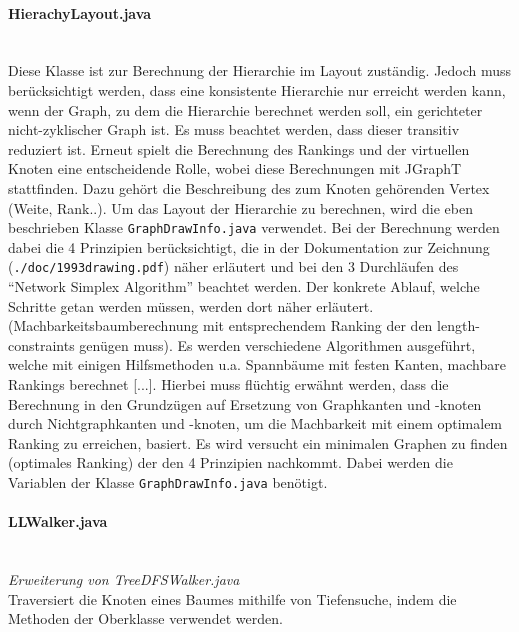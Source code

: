 \documentclass[10pt,a4paper]{article}
\begin{document}
\paragraph{HierachyLayout.java}\ \\
{\footnotesize Diese Klasse ist zur Berechnung der Hierarchie im Layout zuständig. Jedoch muss berücksichtigt werden, dass eine konsistente Hierarchie nur erreicht werden kann, wenn der Graph, zu dem die Hierarchie berechnet werden soll, ein gerichteter nicht-zyklischer Graph ist. Es muss beachtet werden, dass dieser transitiv reduziert ist. Erneut spielt die Berechnung des Rankings und der virtuellen Knoten eine entscheidende Rolle, wobei diese Berechnungen mit JGraphT stattfinden. Dazu gehört die Beschreibung des zum Knoten gehörenden Vertex (Weite, Rank..). Um das Layout der Hierarchie zu berechnen, wird die eben beschrieben Klasse \texttt{GraphDrawInfo.java} verwendet. Bei der Berechnung werden dabei die 4 Prinzipien berücksichtigt, die in der Dokumentation zur Zeichnung (\texttt{./doc/1993drawing.pdf}) näher erläutert und bei den 3 Durchläufen des "`Network Simplex Algorithm"' beachtet werden. Der konkrete Ablauf, welche Schritte getan werden müssen, werden dort näher erläutert. (Machbarkeitsbaumberechnung mit entsprechendem Ranking der den length-constraints genügen muss).  Es werden verschiedene Algorithmen ausgeführt, welche mit einigen Hilfsmethoden u.a. Spannbäume mit festen Kanten, machbare Rankings berechnet [...]. Hierbei muss flüchtig erwähnt werden, dass die Berechnung in den Grundzügen auf Ersetzung von Graphkanten und -knoten durch Nichtgraphkanten und -knoten, um die Machbarkeit mit einem optimalem Ranking zu erreichen, basiert. Es wird versucht ein minimalen Graphen zu finden (optimales Ranking) der den 4 Prinzipien nachkommt. Dabei werden die Variablen der Klasse \texttt{GraphDrawInfo.java} benötigt.} 

\paragraph{LLWalker.java}\ \\
\emph{Erweiterung von TreeDFSWalker.java}\\
{\footnotesize Traversiert die Knoten eines Baumes mithilfe von Tiefensuche, indem die Methoden der Oberklasse verwendet werden.}
\end{document}
